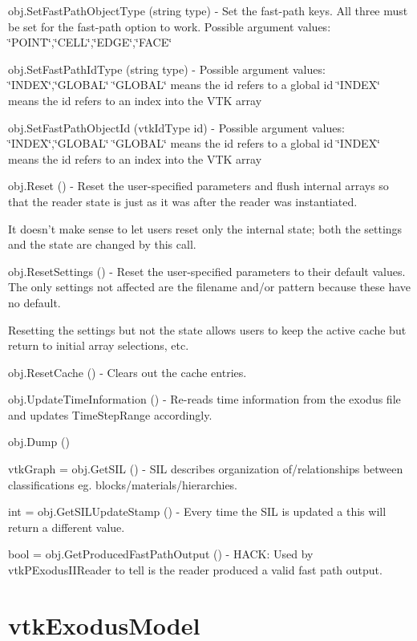 \begin{DoxyItemize}
\item {\ttfamily obj.\-Set\-Fast\-Path\-Object\-Type (string type)} -\/ Set the fast-\/path keys. All three must be set for the fast-\/path option to work. Possible argument values\-: \char`\"{}\-P\-O\-I\-N\-T\char`\"{},\char`\"{}\-C\-E\-L\-L\char`\"{},\char`\"{}\-E\-D\-G\-E\char`\"{},\char`\"{}\-F\-A\-C\-E\char`\"{}  
\item {\ttfamily obj.\-Set\-Fast\-Path\-Id\-Type (string type)} -\/ Possible argument values\-: \char`\"{}\-I\-N\-D\-E\-X\char`\"{},\char`\"{}\-G\-L\-O\-B\-A\-L\char`\"{} \char`\"{}\-G\-L\-O\-B\-A\-L\char`\"{} means the id refers to a global id \char`\"{}\-I\-N\-D\-E\-X\char`\"{} means the id refers to an index into the V\-T\-K array  
\item {\ttfamily obj.\-Set\-Fast\-Path\-Object\-Id (vtk\-Id\-Type id)} -\/ Possible argument values\-: \char`\"{}\-I\-N\-D\-E\-X\char`\"{},\char`\"{}\-G\-L\-O\-B\-A\-L\char`\"{} \char`\"{}\-G\-L\-O\-B\-A\-L\char`\"{} means the id refers to a global id \char`\"{}\-I\-N\-D\-E\-X\char`\"{} means the id refers to an index into the V\-T\-K array  
\item {\ttfamily obj.\-Reset ()} -\/ Reset the user-\/specified parameters and flush internal arrays so that the reader state is just as it was after the reader was instantiated.

It doesn't make sense to let users reset only the internal state; both the settings and the state are changed by this call.  
\item {\ttfamily obj.\-Reset\-Settings ()} -\/ Reset the user-\/specified parameters to their default values. The only settings not affected are the filename and/or pattern because these have no default.

Resetting the settings but not the state allows users to keep the active cache but return to initial array selections, etc.  
\item {\ttfamily obj.\-Reset\-Cache ()} -\/ Clears out the cache entries.  
\item {\ttfamily obj.\-Update\-Time\-Information ()} -\/ Re-\/reads time information from the exodus file and updates Time\-Step\-Range accordingly.  
\item {\ttfamily obj.\-Dump ()}  
\item {\ttfamily vtk\-Graph = obj.\-Get\-S\-I\-L ()} -\/ S\-I\-L describes organization of/relationships between classifications eg. blocks/materials/hierarchies.  
\item {\ttfamily int = obj.\-Get\-S\-I\-L\-Update\-Stamp ()} -\/ Every time the S\-I\-L is updated a this will return a different value.  
\item {\ttfamily bool = obj.\-Get\-Produced\-Fast\-Path\-Output ()} -\/ H\-A\-C\-K\-: Used by vtk\-P\-Exodus\-I\-I\-Reader to tell is the reader produced a valid fast path output.  
\end{DoxyItemize}\hypertarget{vtkhybrid_vtkexodusmodel}{}\section{vtk\-Exodus\-Model}\label{vtkhybrid_vtkexodusmodel}
